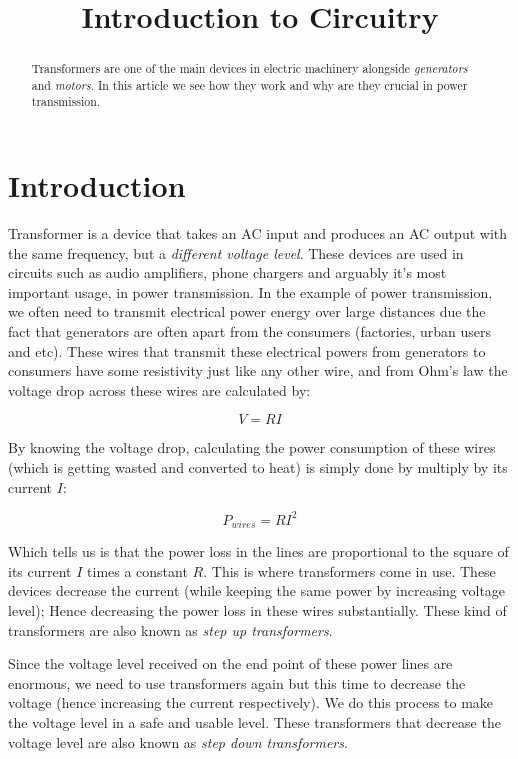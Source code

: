 \documentclass{article}
\begin{document}
	
	\title{Introduction to Circuitry}
	\author{}
	
	\maketitle
	
	\begin{abstract}
	Transformers are one of the main devices in electric machinery alongside \textit{generators} and \textit{motors}.
	In this article we see how they work and why are they crucial in power transmission.
	\end{abstract}
	
	\section{Introduction}
	Transformer is a device that takes an AC input and produces an AC output with the same frequency, but a \textit{different voltage level}.
	These devices are used in circuits such as audio amplifiers, phone chargers and arguably it's most important usage, in power transmission.
	In the example of power transmission, we often need to transmit electrical power energy over large distances due the fact that generators are often apart from the consumers (factories, urban users and etc). These wires that transmit these electrical powers from generators to consumers have some resistivity just like any other wire, and from Ohm's law the voltage drop across these wires are calculated by:
	
	$$V = RI$$
	
	By knowing the voltage drop, calculating the power consumption of these wires (which is getting wasted and converted to heat) is simply done by multiply by its current $I$:
	
	$$P_{wires} = RI^2 $$
	
	Which tells us is that the power loss in the lines are proportional to the square of its current $I$ times a constant $R$.
	This is where transformers come in use.
	These devices decrease the current (while keeping the same power by increasing voltage level); Hence decreasing the power loss in these wires substantially.
	These kind of transformers are also known as \textit{step up transformers}.
	
	Since the voltage level received on the end point of these power lines are enormous, we need to use transformers again but this time to decrease the voltage (hence increasing the current respectively).
	We do this process to make the voltage level in a safe and usable level. These transformers that decrease the voltage level are also known as \textit{step down transformers}.
	
\end{document}
